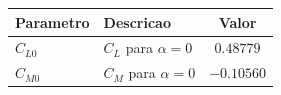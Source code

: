 \begin{tabular}{llc}
\toprule
Parametro & Descricao & Valor \\
\midrule
$C_{L0}$ & $C_L$ para $\alpha=0$ & $0.48779$ \\
$C_{M0}$ & $C_M$ para $\alpha=0$ & $-0.10560$ \\
\bottomrule
\end{tabular}
